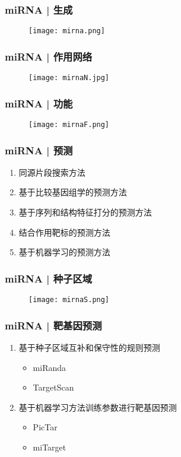 \begin{frame}
	\frametitle{miRNA | 生成}
	\begin{figure}
		\centering
		\texttt{[image: mirna.png]}
	\end{figure}
\end{frame}

\begin{frame}
	\frametitle{miRNA | 作用网络}
	\begin{figure}
		\centering
		\texttt{[image: mirnaN.jpg]}
	\end{figure}
\end{frame}

\begin{frame}
	\frametitle{miRNA | 功能}
	\begin{figure}
		\centering
		\texttt{[image: mirnaF.png]}
	\end{figure}
\end{frame}

\begin{frame}
	\frametitle{miRNA | 预测}
	\begin{enumerate}
		\item 同源片段搜索方法
		\item 基于比较基因组学的预测方法
		\item 基于序列和结构特征打分的预测方法
		\item 结合作用靶标的预测方法
		\item 基于机器学习的预测方法
	\end{enumerate}
\end{frame}

\begin{frame}
	\frametitle{miRNA | 种子区域}
	\begin{figure}
		\centering
		\texttt{[image: mirnaS.png]}
	\end{figure}
\end{frame}

\begin{frame}
	\frametitle{miRNA | 靶基因预测}
	\begin{enumerate}
		\item 基于种子区域互补和保守性的规则预测
			\begin{itemize}
				\item miRanda
				\item TargetScan
			\end{itemize}
		\item 基于机器学习方法训练参数进行靶基因预测
			\begin{itemize}
				\item PicTar
				\item miTarget
			\end{itemize}
	\end{enumerate}
\end{frame}

